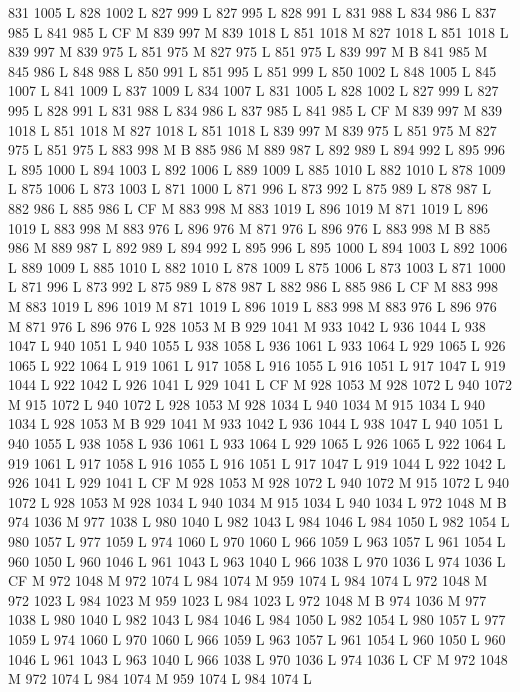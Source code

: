{{{{{{{{{{{{{{{{{{831 1005 L
828 1002 L
827 999 L
827 995 L
828 991 L
831 988 L
834 986 L
837 985 L
841 985 L
CF M
839 997 M 839 1018 L
851 1018 M 827 1018 L
851 1018 L
839 997 M 839 975 L
851 975 M 827 975 L
851 975 L
839 997 M B
841 985 M 845 986 L
848 988 L
850 991 L
851 995 L
851 999 L
850 1002 L
848 1005 L
845 1007 L
841 1009 L
837 1009 L
834 1007 L
831 1005 L
828 1002 L
827 999 L
827 995 L
828 991 L
831 988 L
834 986 L
837 985 L
841 985 L
CF M
839 997 M 839 1018 L
851 1018 M 827 1018 L
851 1018 L
839 997 M 839 975 L
851 975 M 827 975 L
851 975 L
883 998 M B
885 986 M 889 987 L
892 989 L
894 992 L
895 996 L
895 1000 L
894 1003 L
892 1006 L
889 1009 L
885 1010 L
882 1010 L
878 1009 L
875 1006 L
873 1003 L
871 1000 L
871 996 L
873 992 L
875 989 L
878 987 L
882 986 L
885 986 L
CF M
883 998 M 883 1019 L
896 1019 M 871 1019 L
896 1019 L
883 998 M 883 976 L
896 976 M 871 976 L
896 976 L
883 998 M B
885 986 M 889 987 L
892 989 L
894 992 L
895 996 L
895 1000 L
894 1003 L
892 1006 L
889 1009 L
885 1010 L
882 1010 L
878 1009 L
875 1006 L
873 1003 L
871 1000 L
871 996 L
873 992 L
875 989 L
878 987 L
882 986 L
885 986 L
CF M
883 998 M 883 1019 L
896 1019 M 871 1019 L
896 1019 L
883 998 M 883 976 L
896 976 M 871 976 L
896 976 L
928 1053 M B
929 1041 M 933 1042 L
936 1044 L
938 1047 L
940 1051 L
940 1055 L
938 1058 L
936 1061 L
933 1064 L
929 1065 L
926 1065 L
922 1064 L
919 1061 L
917 1058 L
916 1055 L
916 1051 L
917 1047 L
919 1044 L
922 1042 L
926 1041 L
929 1041 L
CF M
928 1053 M 928 1072 L
940 1072 M 915 1072 L
940 1072 L
928 1053 M 928 1034 L
940 1034 M 915 1034 L
940 1034 L
928 1053 M B
929 1041 M 933 1042 L
936 1044 L
938 1047 L
940 1051 L
940 1055 L
938 1058 L
936 1061 L
933 1064 L
929 1065 L
926 1065 L
922 1064 L
919 1061 L
917 1058 L
916 1055 L
916 1051 L
917 1047 L
919 1044 L
922 1042 L
926 1041 L
929 1041 L
CF M
928 1053 M 928 1072 L
940 1072 M 915 1072 L
940 1072 L
928 1053 M 928 1034 L
940 1034 M 915 1034 L
940 1034 L
972 1048 M B
974 1036 M 977 1038 L
980 1040 L
982 1043 L
984 1046 L
984 1050 L
982 1054 L
980 1057 L
977 1059 L
974 1060 L
970 1060 L
966 1059 L
963 1057 L
961 1054 L
960 1050 L
960 1046 L
961 1043 L
963 1040 L
966 1038 L
970 1036 L
974 1036 L
CF M
972 1048 M 972 1074 L
984 1074 M 959 1074 L
984 1074 L
972 1048 M 972 1023 L
984 1023 M 959 1023 L
984 1023 L
972 1048 M B
974 1036 M 977 1038 L
980 1040 L
982 1043 L
984 1046 L
984 1050 L
982 1054 L
980 1057 L
977 1059 L
974 1060 L
970 1060 L
966 1059 L
963 1057 L
961 1054 L
960 1050 L
960 1046 L
961 1043 L
963 1040 L
966 1038 L
970 1036 L
974 1036 L
CF M
972 1048 M 972 1074 L
984 1074 M 959 1074 L
984 1074 L
}}}}}}}}}}}}}}}}}}
